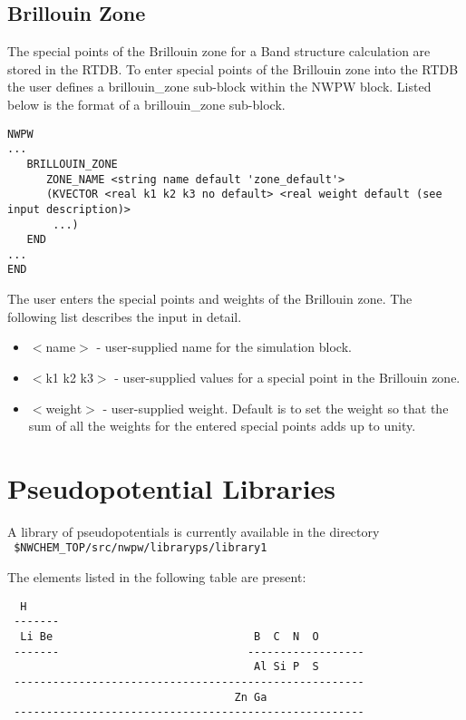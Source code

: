 \subsection{Brillouin Zone}
\label{sec:band_brillouin_zone}
The special points of the Brillouin zone for a Band structure calculation are 
stored in the RTDB.  To enter special points of the Brillouin zone into the RTDB 
the user defines a brillouin\_zone sub-block within the NWPW 
block.  Listed below is the format of a brillouin\_zone sub-block.
\begin{verbatim}
NWPW
...
   BRILLOUIN_ZONE
      ZONE_NAME <string name default 'zone_default'>
      (KVECTOR <real k1 k2 k3 no default> <real weight default (see input description)>
       ...)
   END
...
END
\end{verbatim}
The user enters the special points and weights of the
Brillouin zone.  The following list describes the input in detail.
\begin{itemize}
        \item $<$name$>$ - user-supplied name for the simulation block. 
        \item $<$k1 k2 k3$>$ - user-supplied values for a special point in the
                               Brillouin zone.
        \item $<$weight$>$ - user-supplied weight.  Default is to set the weight
                         so that the sum of all the weights for the entered  
                         special points adds up to unity.
\end{itemize}


\section{Pseudopotential Libraries}
\label{sec:psp_library}

A library of pseudopotentials is currently available  in the
directory \\
\verb+ $NWCHEM_TOP/src/nwpw/libraryps/library1+

The elements listed in the following table are present:

\begin{verbatim}
  H
 -------
  Li Be                               B  C  N  O
 -------                             ------------------
                                      Al Si P  S     
 ------------------------------------------------------
                                   Zn Ga               
 ------------------------------------------------------
\end{verbatim}

